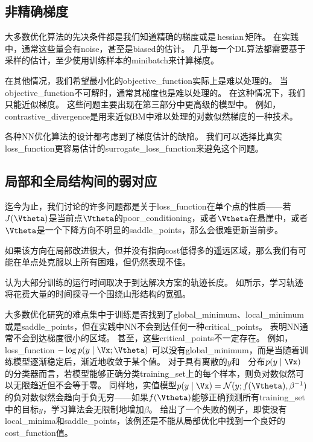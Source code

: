 \subsection{非精确梯度}
\label{sec:inexact_gradients}
大多数优化算法的先决条件都是我们知道精确的梯度或是\,\gls{hessian}\,矩阵。
在实践中，通常这些量会有\gls{noise}，甚至是\gls{biased}的估计。
几乎每一个\gls{DL}算法都需要基于采样的估计，至少使用训练样本的\gls{minibatch}来计算梯度。


在其他情况，我们希望最小化的\gls{objective_function}实际上是难以处理的。
当\gls{objective_function}不可解时，通常其梯度也是难以处理的。
在这种情况下，我们只能近似梯度。
这些问题主要出现在第三部分中更高级的模型中。
例如，\gls{contrastive_divergence}是用来近似\gls{BM}中难以处理的对数似然梯度的一种技术。


各种\gls{NN}优化算法的设计都考虑到了梯度估计的缺陷。
我们可以选择比真实\gls{loss_function}更容易估计的\gls{surrogate_loss_function}来避免这个问题。


\subsection{局部和全局结构间的弱对应}
\label{sec:poor_correspondence_between_local_and_global_structure}
迄今为止，我们讨论的许多问题都是关于\gls{loss_function}在单个点的性质——若$J(\Vtheta)$是当前点$\Vtheta$的\gls{poor_conditioning}，或者$\Vtheta$在悬崖中，或者$\Vtheta$是一个下降方向不明显的\gls{saddle_points}，那么会很难更新当前步。


如果该方向在局部改进很大，但并没有指向\gls{cost}低得多的遥远区域，那么我们有可能在单点处克服以上所有困难，但仍然表现不佳。


\cite{Goodfellow-et-al-2015}认为大部分训练的运行时间取决于到达解决方案的轨迹长度。 
如所示，学习轨迹将花费大量的时间探寻一个围绕山形结构的宽弧。


大多数优化研究的难点集中于训练是否找到了\gls{global_minimum}、\gls{local_minimum}或是\gls{saddle_points}，但在实践中\gls{NN}不会到达任何一种\gls{critical_points}。
表明\gls{NN}通常不会到达梯度很小的区域。
甚至，这些\gls{critical_points}不一定存在。
例如，\gls{loss_function} $-\log p(y\mid\Vx;\Vtheta)$ 可以没有\gls{global_minimum}，而是当随着训练模型逐渐稳定后，渐近地收敛于某个值。    
对于具有离散的$y$和~~分布$p(y\mid\Vx)$的分类器而言，若模型能够正确分类\gls{training_set}上的每个样本，则负对数似然可以无限趋近但不会等于零。
同样地，实值模型$p(y\mid\Vx) = \mathcal{N}(y;f(\Vtheta),\beta^{-1})$的负对数似然会趋向于负无穷——如果$f(\Vtheta)$能够正确预测所有\gls{training_set}中的目标$y$，学习算法会无限制地增加$\beta$。
给出了一个失败的例子，即使没有\gls{local_minima}和\gls{saddle_points}，该例还是不能从局部优化中找到一个良好的\gls{cost_function}值。

